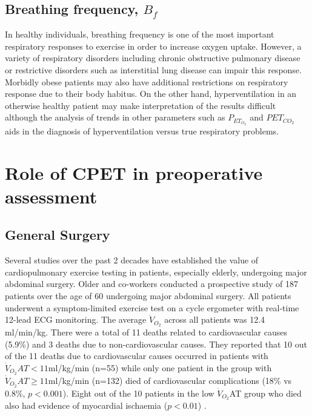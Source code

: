 \subsection{Breathing frequency, $B_f$}
In healthy individuals, breathing frequency is one of the most important respiratory responses to exercise in order to increase oxygen uptake. 
However, a variety of respiratory disorders including chronic obstructive pulmonary disease or restrictive disorders such as interstitial lung disease can impair this response. 
Morbidly obese patients may also have additional restrictions on respiratory response due to their body habitus. 
On the other hand, hyperventilation in an otherwise healthy patient may make interpretation of the results difficult although the analysis of trends in other parameters such as $P_{ET_{O_2}}$ and $P{ET_{CO_2}}$ aids in the diagnosis of hyperventilation versus true respiratory problems.

\section{Role of CPET in preoperative assessment}
\label{sec:cpx_roleInAssessment}
\subsection{General Surgery}

Several studies over the past 2 decades have established the value of cardiopulmonary exercise testing in patients, especially elderly, undergoing major abdominal surgery. 
Older and co-workers conducted a prospective study of 187 patients over the age of 60 undergoing major abdominal surgery. 
All patients underwent a symptom-limited exercise test on a cycle ergometer with real-time 12-lead ECG monitoring. 
The average $\dot{V}_{O_2}$ across all patients was 12.4 ml/min/kg. 
There were a total of 11 deaths related to cardiovascular causes (5.9\%) and 3 deaths due to non-cardiovascular causes. 
They reported that 10 out of the 11 deaths due to cardiovascular causes occurred in patients with $\dot{V}_{O_2}AT<11$ml/kg/min (n=55) while only one patient in the group with $\dot{V}_{O_2}AT\geq11$ml/kg/min (n=132) died of cardiovascular complications (18\% vs 0.8\%, $p<0.001$). 
Eight out of the 10 patients in the low $\dot{V}_{O_2}$AT group who died also had evidence of myocardial ischaemia ($p<0.01$) \parencite{older_preoperative_1993}. 
 
